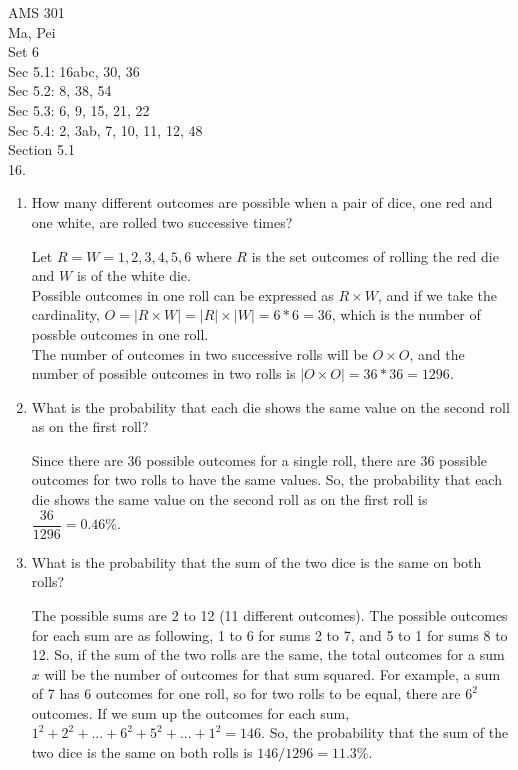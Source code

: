 \documentclass[12pt]{article}
\begin{document}
\noindent
AMS 301\\
Ma, Pei \\
Set 6\\

Sec 5.1: 16abc, 30, 36\\
Sec 5.2: 8, 38, 54\\
Sec 5.3: 6, 9, 15, 21, 22\\ 
Sec 5.4: 2, 3ab, 7, 10, 11, 12, 48\\

Section 5.1\\
16. \begin{enumerate}[label=(\alph*)]
    \item How many different outcomes are possible when 
    a pair of dice, one red and one white, 
    are rolled two successive times? 
    \begin{solution}
        Let $R = W = {1, 2, 3, 4, 5, 6}$ where $R$ is the set 
        outcomes of rolling the red die and $W$ is of the white die.\\
        Possible outcomes in one roll can be expressed as $R \times W$, 
        and if we take the cardinality, $O=|R\times W| = |R| \times |W|
        =6*6=36$, which is the number of possble outcomes in one roll.\\
        The number of outcomes in two successive rolls will be 
        $O\times O$, and the number of possible outcomes in two rolls 
        is $|O\times O|=36*36 = 1296$. 
    \end{solution}
    \item What is the probability that each die shows the 
    same value on the second roll as on the first roll? 
    \begin{solution}
        Since there are 36 possible outcomes for a single roll, 
        there are 36 possible outcomes for two rolls to have the
        same values. So, the probability that each die shows the 
        same value on the second roll as on the first roll is 
        $\dfrac{36}{1296} = 0.46\%$. 
    \end{solution}
    \item What is the probability that the sum of the 
    two dice is the same on both rolls?
    \begin{solution}
        The possible sums are 2 to 12 (11 different outcomes). 
        The possible outcomes for each sum are as following, 
        1 to 6 for sums 2 to 7, and 5 to 1 for sums 8 to 12. 
        So, if the sum of the two rolls are the same, the total
        outcomes for a sum $x$ will be the number of outcomes
        for that sum squared. For example, a sum of 7 has 6 
        outcomes for one roll, so for two rolls to be 
        equal, there are $6^2$ outcomes. If we sum up the outcomes 
        for each sum, $1^2+2^2+...+6^2+5^2+...+1^2=146$. 
        So, the probability that the sum of the two dice is 
        the same on both rolls is $146/1296 = 11.3\%$. 
    \end{solution} 
\end{enumerate}
\end{document}
